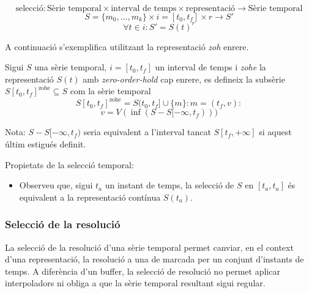 \begin{definition}
  \[
  \text{selecció}: \text{Sèrie temporal} \times \text{interval de
    temps} \times \text{representació} \longrightarrow \text{Sèrie
    temporal}
  \]
  \[
  S = \{m_0 , \ldots , m_k\}  \times i = [t_0,t_f] \times r \longrightarrow S'
  \]
  \[
  \forall  t \in i: S' = S(t)^r 
  \] 
\end{definition}

A continuació s'exemplifica utilitzant la representació \emph{zoh} enrere.


\begin{definition}
  Sigui $S$ una sèrie temporal, $i=[t_0,t_f]$ un interval de temps i
  \emph{zohe} la representació $S(t)$ amb \emph{zero-order-hold} cap
  enrere, es defineix la subsèrie $S[t_0,t_f]^{\text{zohe}}\subseteq
  S$ com la sèrie temporal 
  \[
  S[t_0,t_f]^{\text{zohe}} = S(t_0,t_f] \cup \{m\} : m=(t_f,v):
  \]
  \[
  v=  V(\inf(S-S[-\infty,t_f)))
  \]

  
  Nota: $S-S[-\infty,t_f)$ seria equivalent a l'interval tancat
  $S[t_f,+\infty]$ si aquest últim estigués definit.
\end{definition}

Propietats de la selecció temporal:

\begin{itemize}
\item Observeu que, sigui $t_a$ un instant de temps, la selecció de $S$ en $[t_a,t_a]$ és equivalent a la representació contínua $S(t_a)$. 
\end{itemize}







\subsubsection{Selecció de la resolució}

La selecció de la resolució d'una sèrie temporal permet canviar, en el
context d'una representació, la resolució a una de marcada per un
conjunt d'instants de temps. A diferència d'un buffer, la selecció de
resolució no permet aplicar interpoladors ni obliga a que la sèrie
temporal resultant sigui regular.

